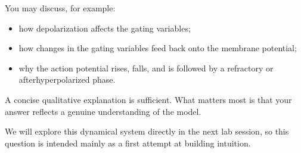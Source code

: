 \documentclass{article}
\begin{document}
You may discuss, for example:
\begin{itemize}
    \item how depolarization affects the gating variables;
    \item how changes in the gating variables feed back onto the membrane potential;
    \item why the action potential rises, falls, and is followed by a refractory or afterhyperpolarized phase.
\end{itemize}

A concise qualitative explanation is sufficient. What matters most is that your answer reflects a genuine understanding of the model.

We will explore this dynamical system directly in the next lab session, so this question is intended mainly as a first attempt at building intuition.

\vspace{2em}
\end{document}
